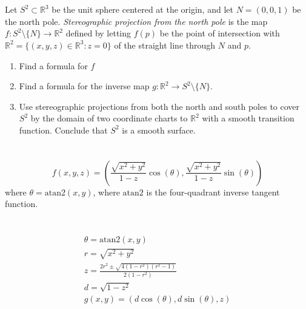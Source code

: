 \documentclass{jhwhw}
\newcommand{\R}{{\mathbb R}}
\begin{document}
\part{}%
\part{}%


\problem{}%
Let $S^2\subset \mathbb{R}^3$ be the unit sphere centered at the origin, and  let $N = (0,0,1)$ be the north pole.  \emph{Stereographic  projection from the north pole} is the map   $f:S^2\setminus\{N\}\to\mathbb{R}^2$ defined by letting  $f(p)$ be the point of intersection with $\mathbb{R}^2 = \{(x,y,z)\in\mathbb{R}^3:z=0\}$ of the straight line through $N$ and $p$.  
\begin{enumerate}
	\item Find a formula for $f$
	\item Find a formula for the inverse map $g:\mathbb{R}^2\to S^2\setminus 
	\{N\}$. 
	\item
	Use stereographic projections from both the north and south poles to cover $S^2$ by the domain of two coordinate charts to $\R^2$ with a smooth transition function.  Conclude that $S^2$ is a smooth surface.
\end{enumerate} 

\solution{}

\part{}%
\begin{equation}
f(x,y,z) = \left(\frac{\sqrt{x^2+y^2}}{1-z}\cos(\theta) , \frac{\sqrt{x^2+y^2}}{1-z}\sin(\theta)\right)
\end{equation}
where $\theta = \mathrm{atan2}(x,y)$, where $\mathrm{atan2}$ is the four-quadrant inverse tangent function.
\part{}%
\begin{gather}
\theta = \mathrm{atan2}(x,y)\\
r = \sqrt{x^2+y^2}\\
z = \frac{2r^2\pm \sqrt{4(1-r^2)(r^2-1)}}{2(1-r^2)}\\
d = \sqrt{1-z^2}\\
g(x,y) = \left(d\cos(\theta),d\sin(\theta),z\right)
\end{gather}
\part{}%
\end{document}
